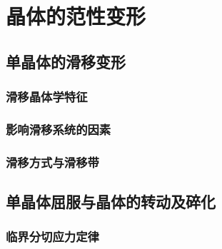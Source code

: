 \chapter{晶体的范性变形}
    \section{单晶体的滑移变形}
        \subsection{滑移晶体学特征}
        \subsection{影响滑移系统的因素}
        \subsection{滑移方式与滑移带}
    \section{单晶体屈服与晶体的转动及碎化}
        \subsection{临界分切应力定律}
